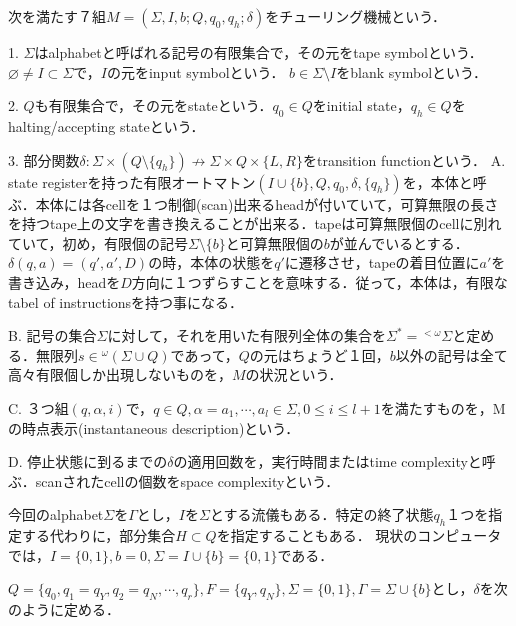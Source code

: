 \documentclass[uplatex, dvipdfmx]{jsreport}
\begin{document}
\begin{screen}\begin{definition}
    次を満たす７組$M=(\Sigma,I,b;Q,q_0,q_h;\delta)$をチューリング機械という．

    1. $\Sigma$はalphabetと呼ばれる記号の有限集合で，その元をtape symbolという．$\varnothing\ne I\subset\Sigma$で，$I$の元をinput symbolという．
    $b\in\Sigma\setminus I$をblank symbolという．

    2. $Q$も有限集合で，その元をstateという．$q_0\in Q$をinitial state，$q_h\in Q$をhalting/accepting stateという．

    3. 部分関数$\delta:\Sigma\times (Q\setminus\{q_h\})\nrightarrow\Sigma\times Q\times\{L,R\}$をtransition functionという．
    \vspace{2ex}
    A. state registerを持った有限オートマトン$(I\cup\{b\},Q,q_0,\delta,\{q_h\})$を，本体と呼ぶ．本体には各cellを１つ制御(scan)出来るheadが付いていて，可算無限の長さを持つtape上の文字を書き換えることが出来る．tapeは可算無限個のcellに別れていて，初め，有限個の記号$\Sigma\setminus\{b\}$と可算無限個の$b$が並んでいるとする．
    $\delta(q,a)=(q',a',D)$の時，本体の状態を$q'$に遷移させ，tapeの着目位置に$a'$を書き込み，headを$D$方向に１つずらすことを意味する．従って，本体は，有限なtabel of instructionsを持つ事になる．

    B. 記号の集合$\Sigma$に対して，それを用いた有限列全体の集合を$\Sigma^*={}^{<\omega}\Sigma$と定める．無限列$s\in {}^\omega(\Sigma\cup Q)$であって，$Q$の元はちょうど１回，$b$以外の記号は全て高々有限個しか出現しないものを，$M$の状況という．

    C. ３つ組$(q,\alpha,i)$で，$q\in Q, \alpha=a_1,\cdots, a_l\in\Sigma, 0\le i\le l+1$を満たすものを，Mの時点表示(instantaneous description)という．

    D. 停止状態に到るまでの$\delta$の適用回数を，実行時間またはtime complexityと呼ぶ．scanされたcellの個数をspace complexityという．
\end{definition}\end{screen}
\begin{notation}
    今回のalphabet$\Sigma$を$\Gamma$とし，$I$を$\Sigma$とする流儀もある．特定の終了状態$q_h$１つを指定する代わりに，部分集合$H\subset Q$を指定することもある．
    現状のコンピュータでは，$I=\{0,1\}, b=0, \Sigma=I\cup\{b\}=\{0,1\}$である．
\end{notation}
\begin{example}
    
\end{example}
\begin{example}[偶奇判定アルゴリズム]
    $Q=\{q_0,q_1=q_Y,q_2=q_N,\cdots,q_r\}, F=\{q_Y,q_N\}, \Sigma=\{0,1\}, \Gamma=\Sigma\cup\{b\}$とし，$\delta$を次のように定める．
\end{example}
\end{document}
